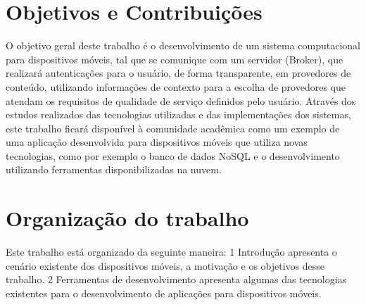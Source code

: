 \section{Objetivos e Contribuições}
O objetivo geral deste trabalho é o desenvolvimento de um sistema computacional para dispositivos móveis, tal que se comunique com um servidor (Broker), que realizará autenticações para o usuário, de forma transparente, em provedores de conteúdo, utilizando informações de contexto para a escolha de provedores que atendam os requisitos de qualidade de serviço definidos pelo usuário.
Através dos estudos realizados das tecnologias utilizadas e das implementações dos sistemas, este trabalho ficará disponível à comunidade acadêmica como um exemplo de uma aplicação desenvolvida para dispositivos móveis que utiliza novas tecnologias, como por exemplo o banco de dados NoSQL e o desenvolvimento utilizando ferramentas disponibilizadas na nuvem.

\section{Organização do trabalho}
Este trabalho está organizado da seguinte maneira: 1 Introdução apresenta o cenário existente dos dispositivos móveis, a motivação e os objetivos desse trabalho. 2 Ferramentas de desenvolvimento apresenta algumas das tecnologias existentes para o desenvolvimento de aplicações para dispositivos móveis.